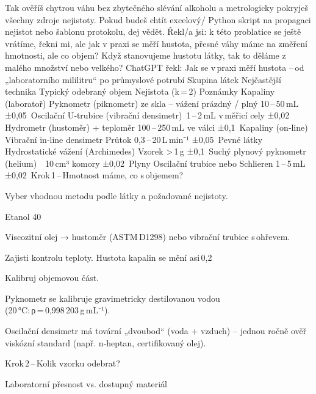 Tak ověříš chytrou váhu bez zbytečného slévání alkoholu a metrologicky pokryješ všechny zdroje nejistoty. Pokud budeš chtít excelový/ Python skript na propagaci nejistot nebo šablonu protokolu, dej vědět.
Řekl/a jsi:
k této problatice se ještě vrátíme, řekni mi, ale jak v praxi se měří hustota, přesné váhy máme na změření hmotnosti, ale co objem? Když stanovujeme hustotu látky, tak to děláme z malého množství nebo velkého? 
ChatGPT řekl:
Jak se v praxi měří hustota – od „laboratorního mililitru“ po průmyslové potrubí
Skupina látek	Nejčastější technika	Typický odebraný objem	Nejistota (k = 2)	Poznámky
Kapaliny (laboratoř)	Pyknometr (piknometr) ze skla – vážení prázdný / plný	10 – 50 mL	±0,05 %
	Oscilační U‑trubice (vibrační densimetr)	 1 – 2 mL v měřicí cely	±0,02 %
	Hydrometr (hustoměr) + teploměr	100 – 250 mL ve válci	±0,1 %
Kapaliny (on‑line)	Vibrační in‑line densimetr	Průtok 0,3 – 20 L min⁻¹	±0,05 %
Pevné látky	Hydrostatické vážení (Archimedes)	Vzorek > 1 g	±0,1 %
	Suchý plynový pyknometr (helium)	~ 10 cm³ komory	±0,02 %
Plyny	Oscilační trubice nebo Schlieren	1 – 5 mL	±0,02 %
Krok 1 – Hmotnost máme, co s objemem?

    Vyber vhodnou metodu podle látky a požadované nejistoty.

        Etanol 40 %

        Viscozitní olej → hustoměr (ASTM D1298) nebo vibrační trubice s ohřevem.

    Zajisti kontrolu teploty. Hustota kapalin se mění asi 0,2 %

    Kalibruj objemovou část.

        Pyknometr se kalibruje gravimetricky destilovanou vodou (20 °C: ρ = 0,998 203 g mL⁻¹).

        Oscilační densimetr má tovární „dvoubod“ (voda + vzduch) – jednou ročně ověř viskózní standard (např. n‑heptan, certifikovaný olej).

Krok 2 – Kolik vzorku odebrat?

    Laboratorní přesnost vs. dostupný materiál

